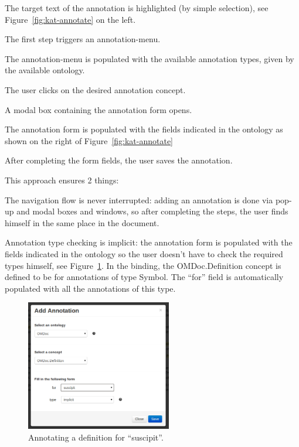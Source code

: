 \begin{compactenum}
\item The target text of the annotation is highlighted (by simple selection), see
  Figure~\ref{fig:kat-annotate} on the left.
\item The first step triggers an annotation-menu.
\item The annotation-menu is populated with the available annotation types, given by the
  available ontology.
\item The user clicks on the desired annotation concept.
\item A modal box containing the annotation form opens.
\item The annotation form is populated with the fields indicated in the ontology as shown
  on the right of Figure~\ref{fig:kat-annotate}
\item After completing the form fields, the user saves the annotation.
\end{compactenum}
This approach ensures 2 things:
\begin{compactitem}
\item The navigation flow is never interrupted: adding an annotation is done via pop-up
  and modal boxes and windows, so after completing the steps, the user finds himself in
  the same place in the document.
\item Annotation type checking is implicit: the annotation form is populated with the
  fields indicated in the ontology so the user doesn’t have to check the required types
  himself, see Figure~\ref{fig:kat-definition}.  In the \KAT binding, the OMDoc.Definition
  concept is defined to be for annotations of type Symbol. The ``for'' field is
  automatically populated with all the annotations of this type.
\end{compactitem}

\begin{figure}[ht]\centering
 \includegraphics[width=2.5in]{../PIC/add-definition}
 \caption{Annotating a definition for ``suscipit''.}\label{fig:kat-definition}
\end{figure}

